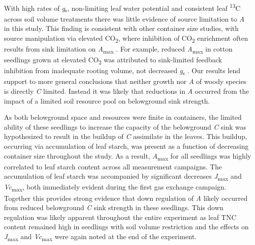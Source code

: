 \documentclass[a4paper]{article}\usepackage[]{graphicx}\usepackage[]{color}
\begin{document}
With high rates of \textit{g}\textsubscript{s}, non-limiting leaf water potential and consistent leaf {\textdelta}\textsuperscript{13}C across soil volume treatments there was little evidence of source limitation to \textit{A} in this study. This finding is consistent with other container size studies, with source manipulation via elevated CO\textsubscript{2}, where inhibition of CO\textsubscript{2} enrichment often results from sink limitation on \textit{A}\textsubscript{max} \citep{arp1991effects, robbins1988effect}. For example, reduced \textit{A}\textsubscript{max} in cotton seedlings grown at elevated CO\textsubscript{2} was attributed to sink-limited feedback inhibition from inadequate rooting volume, not decreased \textit{g}\textsubscript{s} \citep{thomas1991root}. Our results lend support to more general conclusions that neither growth \citep{korner2003carbon} nor \textit{A} \citep{millard2007environmental} of woody species is directly \textit{C} limited. Instead it was likely that reductions in \textit{A} occurred from the impact of a limited soil resource pool on belowground sink strength.

As both belowground space and resources were finite in containers, the limited ability of these seedlings to increase the capacity of the belowground \textit{C} sink was hypothesized to result in the buildup of \textit{C} assimilate in the leaves. This buildup, occurring via accumulation of leaf starch, was present as a function of decreasing container size throughout the study. As a result, \textit{A}\textsubscript{max} for all seedlings was highly correlated to leaf starch content across all measurement campaigns. The accumulation of leaf starch was accompanied by significant decreases \textit{J}\textsubscript{max} and \textit{Vc}\textsubscript{max}, both immediately evident during the first gas exchange campaign. Together this provides strong evidence that down regulation of \textit{A} likely occurred from reduced belowground \textit{C} sink strength in these seedlings. This down regulation was likely apparent throughout the entire experiment as leaf TNC content remained high in seedlings with soil volume restriction and the effects on \textit{J}\textsubscript{max} and \textit{Vc}\textsubscript{max} were again noted at the end of the experiment. 
\end{document}
